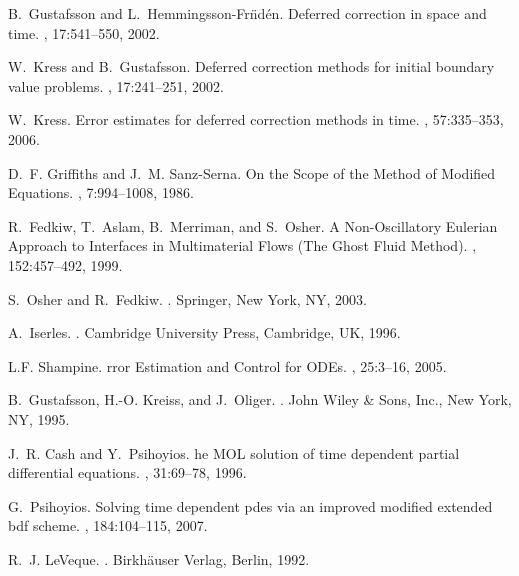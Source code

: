 \documentclass[fleqn,12pt,twoside]{article}
\begin{document}
\begin{thebibliography}{10}
B.~Gustafsson and L.~Hemmingsson-Fr\"nd\'en.
\newblock Deferred correction in space and time.
, 17:541--550, 2002.

W.~Kress and B.~Gustafsson.
\newblock Deferred correction methods for initial boundary value problems.
, 17:241--251, 2002.

W.~Kress.
\newblock Error estimates for deferred correction methods in time.
, 57:335--353, 2006.

D.~F. Griffiths and J.~M. Sanz-Serna.
\newblock On the {S}cope of the {M}ethod of {M}odified {E}quations.
, 7:994--1008, 1986.

R.~Fedkiw, T.~Aslam, B.~Merriman, and S.~Osher.
\newblock A {N}on-{O}scillatory {E}ulerian {A}pproach to {I}nterfaces in
  {M}ultimaterial {F}lows ({T}he {G}host {F}luid {M}ethod).
, 152:457--492, 1999.

S.~Osher and R.~Fedkiw.
.
\newblock Springer, New York, NY, 2003.

A.~Iserles.
.
\newblock Cambridge University Press, Cambridge, UK, 1996.

L.F. Shampine.
rror {E}stimation and {C}ontrol for {ODE}s.
, 25:3--16, 2005.

B.~Gustafsson, H.-O. Kreiss, and J.~Oliger.
.
\newblock John Wiley \& Sons, Inc., New York, NY, 1995.

J.~R. Cash and Y.~Psihoyios.
he {MOL} solution of time dependent partial differential
  equations.
, 31:69--78, 1996.

G.~Psihoyios.
\newblock Solving time dependent pdes via an improved modified extended bdf
  scheme.
, 184:104--115, 2007.

R.~J. LeVeque.
.
\newblock Birkh\"auser Verlag, Berlin, 1992.


\end{thebibliography}
\end{document}
